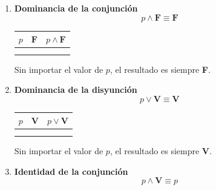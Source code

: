 \begin{enumerate}[label=\alph*)]
\begin{center}
	\renewcommand{\arraystretch}{1.4}
	\begin{tabular}{|c|c|c|}
		\hline
		$p$ & $\lnot p$ & $p \vee \lnot p$ \\
		\hline
		\V & \F & \V \\
		\hline
		\F & \V & \V \\
		\hline
	\end{tabular}
\end{center}
\noindent La columna final es siempre \textbf{V}: $p \vee \lnot p$ es una \textbf{tautología}.

\item \textbf{Dominancia de la conjunción}
\[p \land \mathbf{F} \equiv \mathbf{F}\]

\begin{center}
	\renewcommand{\arraystretch}{1.4}
	\begin{tabular}{|c|c|c|}
		\hline
		$p$ & $\mathbf{F}$ & $p \land \mathbf{F}$ \\
		\hline
		\V & \F & \F \\
		\hline
		\F & \F & \F \\
		\hline
	\end{tabular}
\end{center}
\noindent Sin importar el valor de $p$, el resultado es siempre \textbf{F}.

\item \textbf{Dominancia de la disyunción}
\[p \vee \mathbf{V} \equiv \mathbf{V}\]

\begin{center}
	\renewcommand{\arraystretch}{1.4}
	\begin{tabular}{|c|c|c|}
		\hline
		$p$ & $\mathbf{V}$ & $p \vee \mathbf{V}$ \\
		\hline
		\V & \V & \V \\
		\hline
		\F & \V & \V \\
		\hline
	\end{tabular}
\end{center}
\noindent Sin importar el valor de $p$, el resultado es siempre \textbf{V}.

\item \textbf{Identidad de la conjunción}
\[p \land \mathbf{V} \equiv p\]


\end{enumerate}
